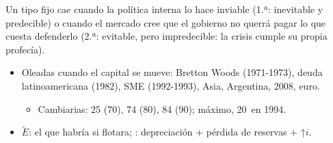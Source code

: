 \documentclass{article}
\begin{document}
\begin{columnas}
\begin{ideaclave}
Un tipo fijo cae cuando la política interna lo hace inviable (1.ª: inevitable y predecible) o cuando el mercado cree que el gobierno no querrá pagar lo que cuesta defenderlo (2.ª: evitable, pero impredecible: la crisis cumple su propia profecía).
\end{ideaclave}
\begin{itemize}
\item Oleadas cuando el capital se mueve: Bretton Woods (1971-1973), deuda latinoamericana (1982), SME (1992-1993), Asia, Argentina, 2008, euro.
  \begin{itemize}
  \item Cambiarias: 25 (70), 74 (80), 84 (90); máximo, 20~en 1994.
  \end{itemize}
\item {} $\tilde E$: el que habría si flotara; : depreciación + pérdida de reservas + ↑$i$.
\end{itemize}


\end{columnas}
\end{document}
